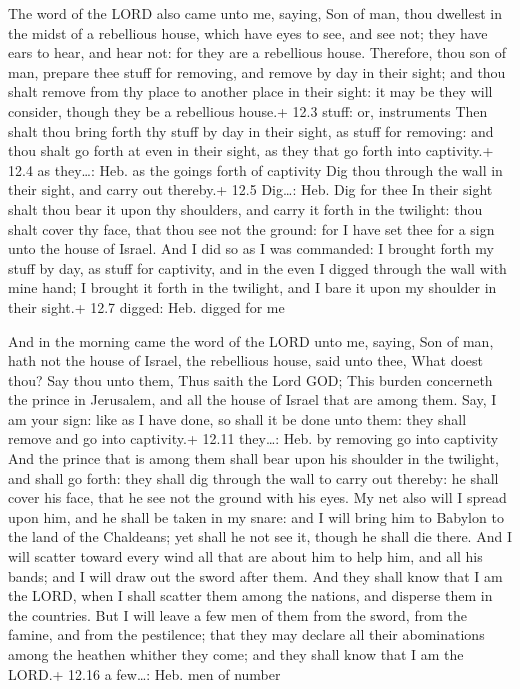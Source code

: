  The word of the LORD also came unto me, saying,
 Son of man, thou dwellest in the midst of a rebellious
house, which have eyes to see, and see not; they have ears to hear, and
hear not: for they are a rebellious house.  Therefore, thou
son of man, prepare thee stuff for removing, and remove by day in their
sight; and thou shalt remove from thy place to another place in their
sight: it may be they will consider, though they be a rebellious house.+
12.3 stuff: or, instruments  Then shalt thou bring forth thy
stuff by day in their sight, as stuff for removing: and thou shalt go
forth at even in their sight, as they that go forth into captivity.+
12.4 as they\ldots: Heb. as the goings forth of captivity 
Dig thou through the wall in their sight, and carry out thereby.+ 12.5
Dig\ldots: Heb. Dig for thee  In their sight shalt thou bear
it upon thy shoulders, and carry it forth in the twilight: thou shalt
cover thy face, that thou see not the ground: for I have set thee for a
sign unto the house of Israel.  And I did so as I was
commanded: I brought forth my stuff by day, as stuff for captivity, and
in the even I digged through the wall with mine hand; I brought it forth
in the twilight, and I bare it upon my shoulder in their sight.+ 12.7
digged: Heb. digged for me

 And in the morning came the word of the LORD unto me,
saying,  Son of man, hath not the house of Israel, the
rebellious house, said unto thee, What doest thou?  Say
thou unto them, Thus saith the Lord GOD; This burden concerneth the
prince in Jerusalem, and all the house of Israel that are among them.
 Say, I am your sign: like as I have done, so shall it be
done unto them: they shall remove and go into captivity.+ 12.11
they\ldots: Heb. by removing go into captivity  And the
prince that is among them shall bear upon his shoulder in the twilight,
and shall go forth: they shall dig through the wall to carry out
thereby: he shall cover his face, that he see not the ground with his
eyes.  My net also will I spread upon him, and he shall be
taken in my snare: and I will bring him to Babylon to the land of the
Chaldeans; yet shall he not see it, though he shall die there.
 And I will scatter toward every wind all that are about
him to help him, and all his bands; and I will draw out the sword after
them.  And they shall know that I am the LORD, when I shall
scatter them among the nations, and disperse them in the countries.
 But I will leave a few men of them from the sword, from
the famine, and from the pestilence; that they may declare all their
abominations among the heathen whither they come; and they shall know
that I am the LORD.+ 12.16 a few\ldots: Heb. men of number

